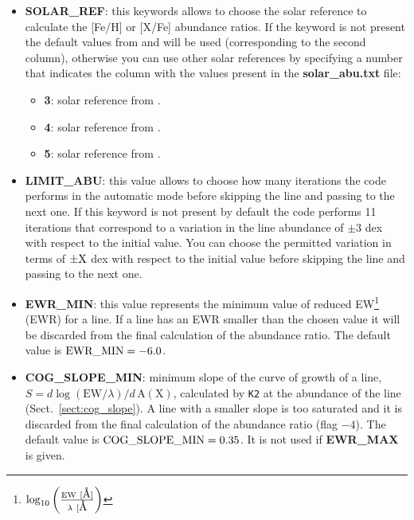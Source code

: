 \documentclass[modern]{aastex701}
\newcommand{\angstrom}{\mbox{\normalfont\AA}}
\begin{document}
\begin{itemize}
        The synthetic\_list must contain a list (to the date with very strict requirements on the names) of all the synthetic spectra that will be used for the analysis. In Sect.~\ref{sect:grid_option} will be provided a full description of how to use \texttt{salvador} with a grid of precomputed synthetic spectra.
    \item {\bf SOLAR\_REF}: this keywords allows to choose the solar reference to calculate the [Fe/H] or [X/Fe] abundance ratios. If the keyword is not present the default values from \citet{caffau_11} and \citet{lodders_10} will be used (corresponding to the second column), otherwise you can use other solar references by specifying a number that indicates the column with the values present in the {\bf solar\_abu.txt} file:
    \begin{itemize}
        \item {\bf 3}: solar reference from \citet{grevesse_98}.
        \item {\bf 4}: solar reference from \citet{magg_22}.
        \item {\bf 5}: solar reference from \citet{asplund_09}.
    \end{itemize}
    \item {\bf LIMIT\_ABU}: this value allows to choose how many iterations the code performs in the automatic mode before skipping the line and passing to the next one. If this keyword is not present by default the code performs 11 iterations that correspond to a variation in the line abundance of $\pm 3$ dex with respect to the initial value. You can choose the permitted variation in terms of $\rm \pm X$ dex with respect to the initial value before skipping the line and passing to the next one.
    \item {\bf EWR\_MIN}: this value represents the minimum value of reduced EW\footnote{$\rm \log_{10}\left(\frac{EW~[\angstrom]}{\lambda~[\angstrom}\right)$} (EWR) for a line. If a line has an EWR smaller than the chosen value it will be discarded from the final calculation of the abundance ratio. The default value is $\rm EWR\_MIN = -6.0$.
    \item {\bf COG\_SLOPE\_MIN}: minimum slope of the curve of growth of a line, $S = d\log(\mathrm{EW}/\lambda)/d\,\mathrm{A(X)}$, calculated by \texttt{K2} at the abundance of the line (Sect.~\ref{sect:cog_slope}). A line with a smaller slope is too saturated and it is discarded from the final calculation of the abundance ratio (flag $-4$). The default value is $\rm COG\_SLOPE\_MIN = 0.35$. It is not used if {\bf EWR\_MAX} is given.

\end{itemize}
\end{document}
